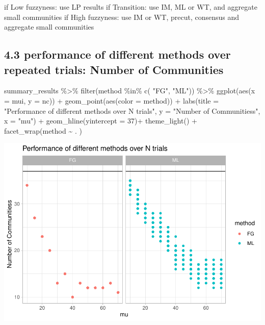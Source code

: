 \documentclass[
]{article}
\newenvironment{Shaded}{\begin{snugshade}}{\end{snugshade}}
\newcommand{\AttributeTok}[1]{\textcolor[rgb]{0.77,0.63,0.00}{#1}}
\newcommand{\DecValTok}[1]{\textcolor[rgb]{0.00,0.00,0.81}{#1}}
\newcommand{\FunctionTok}[1]{\textcolor[rgb]{0.00,0.00,0.00}{#1}}
\newcommand{\NormalTok}[1]{#1}
\newcommand{\SpecialCharTok}[1]{\textcolor[rgb]{0.00,0.00,0.00}{#1}}
\newcommand{\StringTok}[1]{\textcolor[rgb]{0.31,0.60,0.02}{#1}}
\begin{document}
if Low fuzzyness: use LP results if Transition: use IM, ML or WT, and
aggregate small communities if High fuzzyness: use IM or WT, precut,
consensus and aggregate small communities \newpage

\hypertarget{performance-of-different-methods-over-repeated-trials-number-of-communities}{%
\subsection{4.3 performance of different methods over repeated trials:
Number of
Communities}\label{performance-of-different-methods-over-repeated-trials-number-of-communities}}

\begin{Shaded}
\begin{Highlighting}[]
\NormalTok{summary\_results }\SpecialCharTok{\%\textgreater{}\%} 
    \FunctionTok{filter}\NormalTok{(method }\SpecialCharTok{\%in\%} \FunctionTok{c}\NormalTok{( }\StringTok{"FG"}\NormalTok{, }\StringTok{"ML"}\NormalTok{)) }\SpecialCharTok{\%\textgreater{}\%}
  \FunctionTok{ggplot}\NormalTok{(}\FunctionTok{aes}\NormalTok{(}\AttributeTok{x =}\NormalTok{ mui, }\AttributeTok{y =}\NormalTok{ nc)) }\SpecialCharTok{+}
    \FunctionTok{geom\_point}\NormalTok{(}\FunctionTok{aes}\NormalTok{(}\AttributeTok{color =}\NormalTok{ method)) }\SpecialCharTok{+}
    \FunctionTok{labs}\NormalTok{(}\AttributeTok{title =} \StringTok{"Performance of different methods over N trials"}\NormalTok{, }\AttributeTok{y =} \StringTok{"Number of Communitiess"}\NormalTok{, }\AttributeTok{x =} \StringTok{"mu"}\NormalTok{) }\SpecialCharTok{+}
  \FunctionTok{geom\_hline}\NormalTok{(}\AttributeTok{yintercept =} \DecValTok{37}\NormalTok{)}\SpecialCharTok{+}
    \FunctionTok{theme\_light}\NormalTok{() }\SpecialCharTok{+} 
    \FunctionTok{facet\_wrap}\NormalTok{(method }\SpecialCharTok{\textasciitilde{}}\NormalTok{ . )}
\end{Highlighting}
\end{Shaded}

\includegraphics{com_det_algorithms_files/figure-latex/unnamed-chunk-21-1.pdf}
\end{document}

